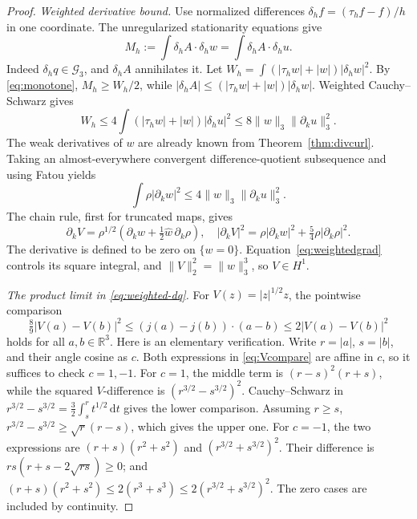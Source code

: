 \documentclass[11pt,a4paper]{article}
\theoremstyle{definition}
\theoremstyle{remark}
\newcommand{\R}{\mathbb R}
\newcommand{\G}{\mathcal G_3}
\newcommand{\dd}{\,\mathrm d}
\newcommand{\norm}[1]{\lVert #1\rVert}
\numberwithin{equation}{section}
\begin{document}
\begin{proof}
\emph{Weighted derivative bound.}
Use normalized differences \(\delta_hf=(\tau_hf-f)/h\) in one coordinate. The unregularized stationarity equations give
\begin{equation}\label{eq:weighted-dq}
M_h:=\int\delta_hA\cdot\delta_hw
=\int\delta_hA\cdot\delta_hu.
\end{equation}
Indeed \(\delta_hq\in\G\), and \(\delta_hA\) annihilates it. Let
\(W_h=\int(|\tau_hw|+|w|)|\delta_hw|^2\). By \eqref{eq:monotone}, \(M_h\ge W_h/2\), while
\(|\delta_hA|\le(|\tau_hw|+|w|)|\delta_hw|\). Weighted Cauchy--Schwarz gives
\[
W_h\le4\int(|\tau_hw|+|w|)|\delta_hu|^2
\le8\norm w_3\norm{\partial_ku}_3^2.
\]
The weak derivatives of \(w\) are already known from Theorem~\ref{thm:divcurl}. Taking an almost-everywhere convergent difference-quotient subsequence and using Fatou yields
\begin{equation}\label{eq:weightedgrad}
\int\rho|\partial_kw|^2\le4\norm w_3\norm{\partial_ku}_3^2.
\end{equation}
The chain rule, first for truncated maps, gives
\[
\partial_kV=\rho^{1/2}\left(\partial_kw+\tfrac12\widehat w\,\partial_k\rho\right),
\quad
|\partial_kV|^2=\rho|\partial_kw|^2+\tfrac54\rho|\partial_k\rho|^2.
\]
The derivative is defined to be zero on \(\{w=0\}\). Equation~\eqref{eq:weightedgrad} controls its square integral, and \(\norm V_2^2=\norm w_3^3\), so \(V\in H^1\).

\emph{The product limit in \eqref{eq:weighted-dq}.}
For \(V(z)=|z|^{1/2}z\), the pointwise comparison
\begin{equation}\label{eq:Vcompare}
\tfrac89|V(a)-V(b)|^2
\le(j(a)-j(b))\cdot(a-b)
\le2|V(a)-V(b)|^2
\end{equation}
holds for all \(a,b\in\R^3\). Here is an elementary verification. Write \(r=|a|\), \(s=|b|\), and their angle cosine as \(c\). Both expressions in \eqref{eq:Vcompare} are affine in \(c\), so it suffices to check \(c=1,-1\). For \(c=1\), the middle term is \((r-s)^2(r+s)\), while the squared \(V\)-difference is \((r^{3/2}-s^{3/2})^2\). Cauchy--Schwarz in
\(r^{3/2}-s^{3/2}=\frac32\int_s^r t^{1/2}\dd t\)
gives the lower comparison. Assuming \(r\ge s\),
\(r^{3/2}-s^{3/2}\ge\sqrt r(r-s)\), which gives the upper one. For \(c=-1\), the two expressions are \((r+s)(r^2+s^2)\) and \((r^{3/2}+s^{3/2})^2\). Their difference is \(rs(r+s-2\sqrt{rs})\ge0\); and
\((r+s)(r^2+s^2)\le2(r^3+s^3)\le2(r^{3/2}+s^{3/2})^2\).
The zero cases are included by continuity.


\end{proof}
\end{document}
